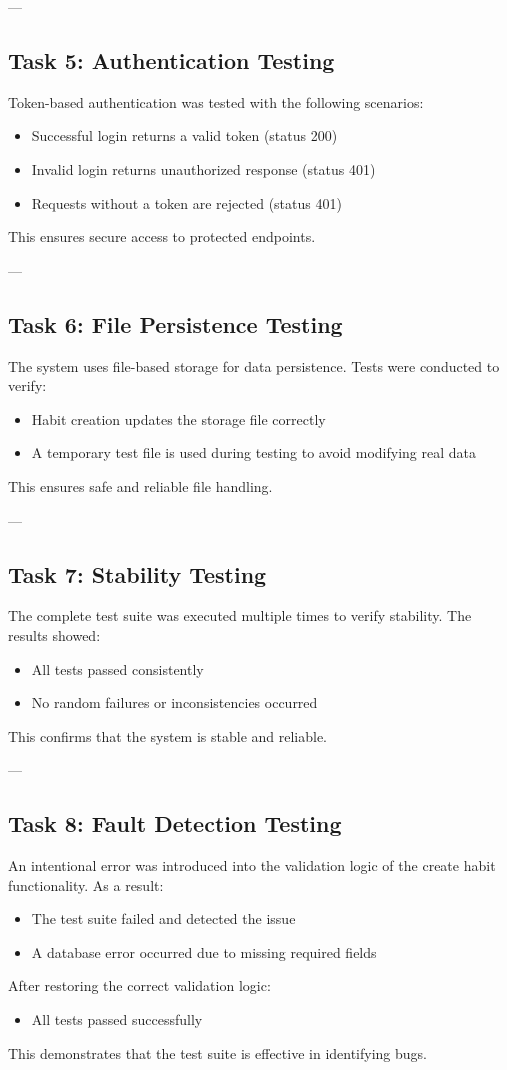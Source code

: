 \documentclass[12pt]{article}
\begin{document}
---

\subsection{Task 5: Authentication Testing}
Token-based authentication was tested with the following scenarios:
\begin{itemize}
    \item Successful login returns a valid token (status 200)
    \item Invalid login returns unauthorized response (status 401)
    \item Requests without a token are rejected (status 401)
\end{itemize}
This ensures secure access to protected endpoints.

---

\subsection{Task 6: File Persistence Testing}
The system uses file-based storage for data persistence. Tests were conducted to verify:
\begin{itemize}
    \item Habit creation updates the storage file correctly
    \item A temporary test file is used during testing to avoid modifying real data
\end{itemize}
This ensures safe and reliable file handling.

---

\subsection{Task 7: Stability Testing}
The complete test suite was executed multiple times to verify stability. The results showed:
\begin{itemize}
    \item All tests passed consistently
    \item No random failures or inconsistencies occurred
\end{itemize}
This confirms that the system is stable and reliable.

---

\subsection{Task 8: Fault Detection Testing}
An intentional error was introduced into the validation logic of the create habit functionality. As a result:
\begin{itemize}
    \item The test suite failed and detected the issue
    \item A database error occurred due to missing required fields
\end{itemize}
After restoring the correct validation logic:
\begin{itemize}
    \item All tests passed successfully
\end{itemize}
This demonstrates that the test suite is effective in identifying bugs.
\end{document}
